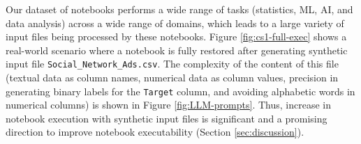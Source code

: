         Our dataset of notebooks performs a wide range of tasks (statistics, ML, AI, and data analysis) across a wide range of domains, which leads to a large variety of input files being processed by these notebooks. Figure \ref{fig:cs1-full-exec} shows a real-world scenario where a notebook is fully restored after generating synthetic input file {\small{\texttt{Social\_Network\_Ads.csv}}}. The complexity of the content of this file (\eg textual data as column names, numerical data as column values, precision in generating binary labels for the {\small{\texttt{Target}}} column, and avoiding alphabetic words in numerical columns) is shown in Figure \ref{fig:LLM-prompts}. Thus, \percentFileNotFoundRestoredInSuccessfullyGenerated increase in notebook execution with synthetic input files is significant and a promising direction to improve notebook executability (Section \ref{sec:discussion}). 
        


        
    


